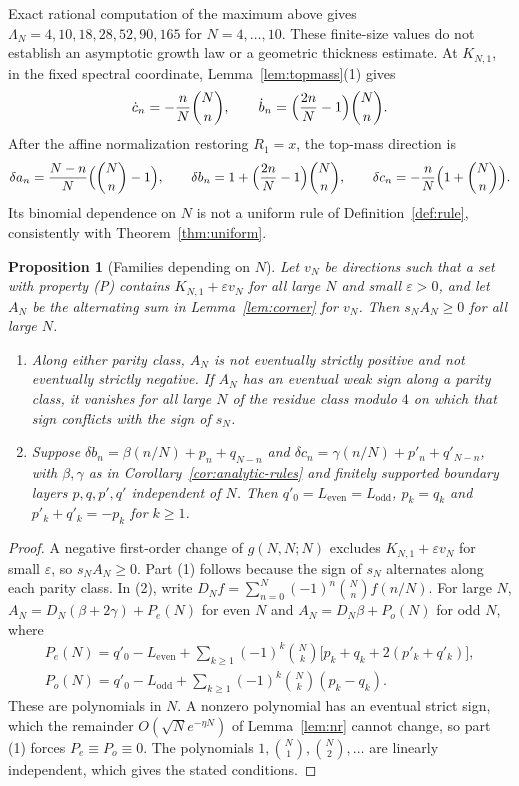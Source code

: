 \documentclass[twoside,10pt]{article}
\numberwithin{equation}{section}
\theoremstyle{slbody}
\newtheorem{proposition}[theorem]{Proposition}
\theoremstyle{definition}
\theoremstyle{remark}
\begin{document}
Exact rational computation of the maximum above gives $\Lambda_N=4,10,18,28,52,90,165$ for $N=4,\ldots,10$. These finite-size values do not establish an asymptotic growth law or a geometric thickness estimate. At $K_{N,1}$, in the fixed spectral coordinate, Lemma~\ref{lem:topmass}(1) gives
\[
\dot c_n=-\frac nN\binom Nn,\qquad\dot b_n=\Bigl(\frac{2n}{N}-1\Bigr)\binom Nn.
\]
After the affine normalization restoring $R_1=x$, the top-mass direction is
\[
\delta a_n=\frac{N-n}{N}\Bigl(\binom Nn-1\Bigr),\qquad
\delta b_n=1+\Bigl(\frac{2n}{N}-1\Bigr)\binom Nn,\qquad
\delta c_n=-\frac nN\Bigl(1+\binom Nn\Bigr).
\]
Its binomial dependence on $N$ is not a uniform rule of Definition~\ref{def:rule}, consistently with Theorem~\ref{thm:uniform}.

\begin{proposition}[Families depending on $N$]\label{prop:families}
Let $v_N$ be directions such that a set with property (P) contains $K_{N,1}+\varepsilon v_N$ for all large $N$ and small $\varepsilon>0$, and let $A_N$ be the alternating sum in Lemma~\ref{lem:corner} for $v_N$. Then $s_NA_N\geq0$ for all large $N$.
\begin{enumerate}
\item Along either parity class, $A_N$ is not eventually strictly positive and not eventually strictly negative. If $A_N$ has an eventual weak sign along a parity class, it vanishes for all large $N$ of the residue class modulo $4$ on which that sign conflicts with the sign of $s_N$.
\item Suppose $\delta b_n=\beta(n/N)+p_n+q_{N-n}$ and $\delta c_n=\gamma(n/N)+p'_n+q'_{N-n}$, with $\beta,\gamma$ as in Corollary~\ref{cor:analytic-rules} and finitely supported boundary layers $p,q,p',q'$ independent of $N$. Then $q'_0=L_{\mathrm{even}}=L_{\mathrm{odd}}$, $p_k=q_k$ and $p'_k+q'_k=-p_k$ for $k\geq1$.
\end{enumerate}
\end{proposition}
\begin{proof}
A negative first-order change of $g(N,N;N)$ excludes $K_{N,1}+\varepsilon v_N$ for small $\varepsilon$, so $s_NA_N\geq0$. Part (1) follows because the sign of $s_N$ alternates along each parity class. In (2), write $D_Nf=\sum_{n=0}^N(-1)^n\binom Nnf(n/N)$. For large $N$, $A_N=D_N(\beta+2\gamma)+P_e(N)$ for even $N$ and $A_N=D_N\beta+P_o(N)$ for odd $N$, where
\begin{gather*}
P_e(N)=q'_0-L_{\mathrm{even}}+\sum_{k\geq1}(-1)^k\binom Nk\bigl[p_k+q_k+2(p'_k+q'_k)\bigr],\\
P_o(N)=q'_0-L_{\mathrm{odd}}+\sum_{k\geq1}(-1)^k\binom Nk(p_k-q_k).
\end{gather*}
These are polynomials in $N$. A nonzero polynomial has an eventual strict sign, which the remainder $O(\sqrt Ne^{-\eta N})$ of Lemma~\ref{lem:nr} cannot change, so part (1) forces $P_e\equiv P_o\equiv0$. The polynomials $1,\binom N1,\binom N2,\ldots$ are linearly independent, which gives the stated conditions.
\end{proof}
\end{document}
